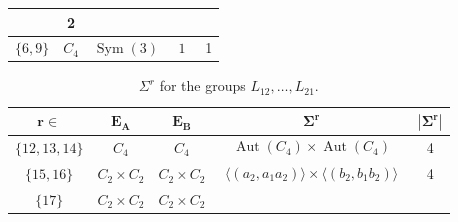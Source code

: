 \documentclass[dvipsnames]{article}
\theoremstyle{definition}
\theoremstyle{remark}
\DeclareMathOperator{\Sym}{Sym}
\DeclareMathOperator{\Aut}{Aut}
\begin{document}
\begin{longtable}{ |c|c|c|c|c|}
\begin{minipage}{3.5cm}
{        \vspace{-5mm}
        }
    \end{minipage}
    & 2\\
    \hline
    $\{6,9\}$
    &
    $C_4$
    &
    $\Sym(3)$
    &
    \begin{minipage}{3.5cm}
        {
        \vspace{-2.5mm}
        \begin{align*}
            1
        \end{align*}
        \vspace{-5mm}
        }
    \end{minipage}
    & 1\\
    \hline
    \end{longtable}

    \begin{longtable}{ |c|c|c|c|c|}
    \caption{$\Sigma^r$ for the groups $L_{12}, \dots, L_{21}$.}
    \label{tbl:sigmasK44}\\
    \hline
    $\boldsymbol{r\in}$ & $\boldsymbol{E_A}$ & $\boldsymbol{E_B}$ & $\boldsymbol{\Sigma^r}$ & $\boldsymbol{|\Sigma^r|}$\\
    \hline
    $\{12,13,14\}$
    &
    $C_4$
    &
    $C_4$
    &
    \begin{minipage}{3.5cm}
        {
        \vspace{-2.5mm}
        \begin{align*}
            \Aut(C_4) \times \Aut(C_4)
        \end{align*}
        \vspace{-5mm}
        }
    \end{minipage}
    & 4\\
    \hline
    $\{15,16\}$
    &
    $C_2 \times C_2$
    &
    $C_2 \times C_2$
    &
    \begin{minipage}{3.5cm}
        {
        \vspace{-2.5mm}
        \begin{align*}
            \langle (a_2, a_1 a_2) \rangle
            \times
            \langle (b_2, b_1 b_2) \rangle
        \end{align*}
        \vspace{-5mm}
        }
    \end{minipage}
    & 4 \\
    \hline
    $\{17\}$
    &
    $C_2 \times C_2$
    &
    $C_2 \times C_2$
    &
    \begin{minipage}{3.5cm}
        {
        \vspace{-2.5mm}
}
\end{minipage}
\end{longtable}
\end{document}
